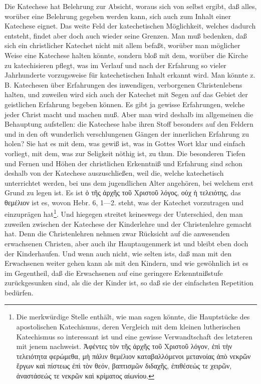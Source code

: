 Die Katechese hat Belehrung zur Absicht, woraus sich von selbst ergibt, daß alles, worüber eine Belehrung gegeben werden kann, sich auch zum Inhalt einer Katechese eignet. Das weite Feld der katechetischen Möglichkeit, welches dadurch entsteht, findet aber doch auch wieder seine Grenzen. Man muß bedenken, daß sich ein christlicher Katechet nicht mit allem befaßt, worüber man möglicher Weise eine Katechese halten könnte, sondern bloß mit dem, worüber die Kirche zu katechisieren pflegt, was im Verlauf und nach der Erfahrung so vieler Jahrhunderte vorzugsweise für katechetischen Inhalt erkannt wird. Man könnte z. B. Katechesen über Erfahrungen des inwendigen, verborgenen Christenlebens halten, und zuweilen wird sich auch der Katechet mit Segen auf das Gebiet der geistlichen Erfahrung begeben können. Es gibt ja gewisse Erfahrungen, welche jeder Christ macht und machen muß. Aber man wird deshalb im allgemeinen die Behauptung aufstellen: die Katechese habe ihren Stoff besonders auf den Feldern und in den oft wunderlich verschlungenen Gängen der innerlichen
Erfahrung zu holen? Sie hat es mit dem, was gewiß ist, was in Gottes Wort klar und einfach vorliegt, mit dem, was zur Seligkeit nöthig ist, zu thun. Die besonderen Tiefen und Fernen und Höhen der christlichen Erkenntniß und Erfahrung sind schon deshalb von der Katechese auszuschließen, weil die, welche katechetisch unterrichtet werden, bei uns dem jugendlichen Alter angehören, bei welchem erst Grund zu legen ist. Es ist ὁ τῆς ἀρχῆς τοῦ Χριστοῦ λόγος, οὐχ ἡ τελειότης, das θεμέλιον ist es, wovon Hebr. 6, 1—2. steht, was der Katechet vorzutragen und einzuprägen hat\footnote{Die merkwürdige Stelle enthält, wie man sagen könnte, die Hauptstücke des apostolischen Katechismus, deren Vergleich mit dem kleinen lutherischen Katechismus so interessant ist und eine gewisse Verwandtschaft des letzteren mit jenem nachweist. Ἀφέντες τὸν τῆς ἀρχῆς τοῦ Χριστοῦ λόγον, ἐπὶ τὴν τελειότητα φερώμεθα, μὴ πάλιν θεμέλιον καταβαλλόμενοι μετανοίας ἀπὸ νεκρῶν ἔργων καὶ πίστεως ἐπὶ τὸν θεόν, βαπτισμῶν διδαχῆς, ἐπιθέσεώς τε χειρῶν, ἀναστάσεώς τε νεκρῶν καὶ κρίματος αἰωνίου.}. Und hiegegen streitet keineswegs der Unterschied, den man zuweilen zwischen der Katechese der Kinderlehre und der Christenlehre gemacht hat. Denn die Christenlehren nehmen zwar Rücksicht auf die anwesenden erwachsenen Christen, aber auch ihr Hauptaugenmerk ist und bleibt eben doch der Kinderhaufen. Und wenn auch nicht, wie selten ists, daß man mit den Erwachsenen weiter gehen kann als mit den Kindern, und wie gewöhnlich ist es im Gegentheil, daß die Erwachsenen auf eine geringere Erkenntnißstufe zurückgesunken sind, als die der Kinder ist, so daß sie der einfachsten Repetition bedürfen.


